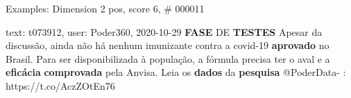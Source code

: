 \begin{frame}{Examples: Dimension 2 pos, score 6, \# 000011}
\footnotesize
\begin{exampleblock}{text: t073912, user: Poder360, 2020-10-29}
 \textbf{FASE} DE \textbf{TESTES} 
 Apesar da discussão, ainda não há nenhum 
imunizante contra a covid-19 \textbf{aprovado} no Brasil. Para ser 
disponibilizada à população, a fórmula precisa ter o aval e a \textbf{eficácia} 
\textbf{comprovada} pela Anvisa. Leia os \textbf{dados} da \textbf{pesquisa} 
@PoderData- : https://t.co/AczZOtEn76 
\end{exampleblock}
\end{frame}
